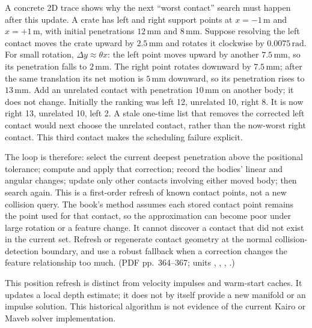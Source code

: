 A concrete 2D trace shows why the next ``worst contact'' search must happen after this update. A crate has left and right support points at \(x=-1\,\mathrm m\) and \(x=+1\,\mathrm m\), with initial penetrations \(12\,\mathrm{mm}\) and \(8\,\mathrm{mm}\). Suppose resolving the left contact moves the crate upward by \(2.5\,\mathrm{mm}\) and rotates it clockwise by \(0.0075\,\mathrm{rad}\). For small rotation, \(\Delta y\approx\theta x\): the left point moves upward by another \(7.5\,\mathrm{mm}\), so its penetration falls to \(2\,\mathrm{mm}\). The right point rotates downward by \(7.5\,\mathrm{mm}\); after the same translation its net motion is \(5\,\mathrm{mm}\) downward, so its penetration rises to \(13\,\mathrm{mm}\). Add an unrelated contact with penetration \(10\,\mathrm{mm}\) on another body; it does not change. Initially the ranking was left 12, unrelated 10, right 8. It is now right 13, unrelated 10, left 2. A stale one-time list that removes the corrected left contact would next choose the unrelated contact, rather than the now-worst right contact. This third contact makes the scheduling failure explicit.

The loop is therefore: select the current deepest penetration above the positional tolerance; compute and apply that correction; record the bodies' linear and angular changes; update only other contacts involving either moved body; then search again. This is a first-order refresh of known contact points, not a new collision query. The book's method assumes each stored contact point remains the point used for that contact, so the approximation can become poor under large rotation or a feature change. It cannot discover a contact that did not exist in the current set. Refresh or regenerate contact geometry at the normal collision-detection boundary, and use a robust fallback when a correction changes the feature relationship too much. (PDF pp.~364--367; units , , , .)

This position refresh is distinct from velocity impulses and warm-start caches. It updates a local depth estimate; it does not by itself provide a new manifold or an impulse solution. This historical algorithm is not evidence of the current Kairo or Maveb solver implementation.

